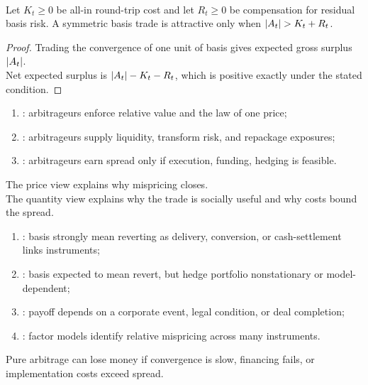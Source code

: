 \documentclass[a4paper,oneside,openany]{book}
\begin{document}
\begin{proposition} \\
Let $K_t\ge0$ be all-in round-trip cost and let $R_t\ge0$ be compensation for residual basis risk. A symmetric basis trade is attractive only when $\left\lvert A_t\right\rvert>K_t+R_t$.
\begin{proof}
Trading the convergence of one unit of basis gives expected gross surplus $\left\lvert A_t\right\rvert$.\\
Net expected surplus is $\left\lvert A_t\right\rvert-K_t-R_t$, which is positive exactly under the stated condition.
\end{proof}
\end{proposition}

\begin{taxonomy} 
\begin{enumerate}[label=\roman*.]
\setlength{\itemsep}{0pt}
\item {}: arbitrageurs enforce relative value and the law of one price;
\item {}: arbitrageurs supply liquidity, transform risk, and repackage exposures;
\item {}: arbitrageurs earn spread only if execution, funding, hedging is feasible.
\end{enumerate}
The price view explains why mispricing closes.\\
The quantity view explains why the trade is socially useful and why costs bound the spread.
\end{taxonomy}

\begin{taxonomy} 
\begin{enumerate}[label=\roman*.]
\setlength{\itemsep}{0pt}
\item {}: basis strongly mean reverting as delivery, conversion, or cash-settlement links instruments;
\item {}: basis expected to mean revert, but hedge portfolio nonstationary or model-dependent;
\item {}: payoff depends on a corporate event, legal condition, or deal completion;
\item {}: factor models identify relative mispricing across many instruments.
\end{enumerate}
Pure arbitrage can lose money if convergence is slow, financing fails, or implementation costs exceed spread.
\end{taxonomy}
\end{document}

